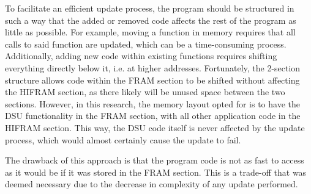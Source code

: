 To facilitate an efficient update process, the program should be structured in such a way that the added or removed code affects the rest of the program as little as possible. For example, moving a function in memory requires that all calls to said function are updated, which can be a time-consuming process. Additionally, adding new code within existing functions requires shifting everything directly below it, i.e. at higher addresses. Fortunately, the 2-section structure allows code within the FRAM section to be shifted without affecting the HIFRAM section, as there likely will be unused space between the two sections. However, in this research, the memory layout opted for is to have the DSU functionality in the FRAM section, with all other application code in the HIFRAM section. This way, the DSU code itself is never affected by the update process, which would almost certainly cause the update to fail. 

The drawback of this approach is that the program code is not as fast to access as it would be if it was stored in the FRAM section. This is a trade-off that was deemed necessary due to the decrease in complexity of any update performed.  
